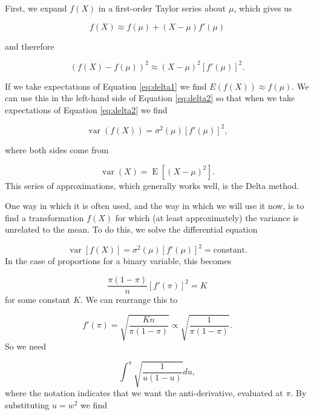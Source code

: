 \documentclass[
  openany]{book}
\theoremstyle{definition}
\theoremstyle{definition}
\theoremstyle{definition}
\theoremstyle{definition}
\theoremstyle{remark}
\begin{document}
First, we expand \(f\left(X\right)\) in a first-order Taylor series about \(\mu\), which gives us

\begin{equation} 
      f\left(X\right) \approx f\left(\mu\right) + \left(X-\mu\right)f'\left(\mu\right)
\label{eq:delta1}
\end{equation}

and therefore

\begin{equation} 
\left(f\left(X\right) - f\left(\mu\right)\right)^2 \approx \left(X-\mu\right)^2\left[f'\left(\mu\right)\right]^2.
\label{eq:delta2}
\end{equation}

If we take expectations of Equation \eqref{eq:delta1} we find \(E\left(f\left(X\right)\right) \approx f\left(\mu\right)\). We can use this in the left-hand side of Equation \eqref{eq:delta2} so that when we take expectations of Equation \eqref{eq:delta2} we find

\begin{equation} 
  \operatorname{var}\left(f\left(X\right)\right) = \sigma^2\left(\mu\right)\left[f'\left(\mu\right)\right]^2,
\label{eq:delta3}
\end{equation}

where both sides come from

\[\operatorname{var}\left(X\right) = \operatorname{E}\left[\left(X - \mu\right)^2\right] .\]
This series of approximations, which generally works well, is the Delta method.

One way in which it is often used, and the way in which we will use it now, is to find a transformation \(f\left(X\right)\) for which (at least approximately) the variance is unrelated to the mean. To do this, we solve the differential equation

\[ \operatorname{var}\left[f\left(X\right)\right] = \sigma^2\left(\mu\right) \left[f'\left(\mu\right)\right]^2 = \text{constant}. \]
In the case of proportions for a binary variable, this becomes

\[ \frac{\pi\left(1-\pi\right)}{n} \left[f'\left(\pi\right)\right]^2 = K\]
for some constant \(K\). We can rearrange this to

\[f'\left(\pi\right) = \sqrt{\frac{Kn}{\pi\left(1-\pi\right)} } \propto \sqrt{\frac{1}{\pi\left(1-\pi\right)}}.\]
So we need

\[\int^\pi \sqrt{\frac{1}{u\left(1-u\right)}}du, \]
where the notation indicates that we want the anti-derivative, evaluated at \(\pi\). By substituting \(u = w^2\) we find
\end{document}
